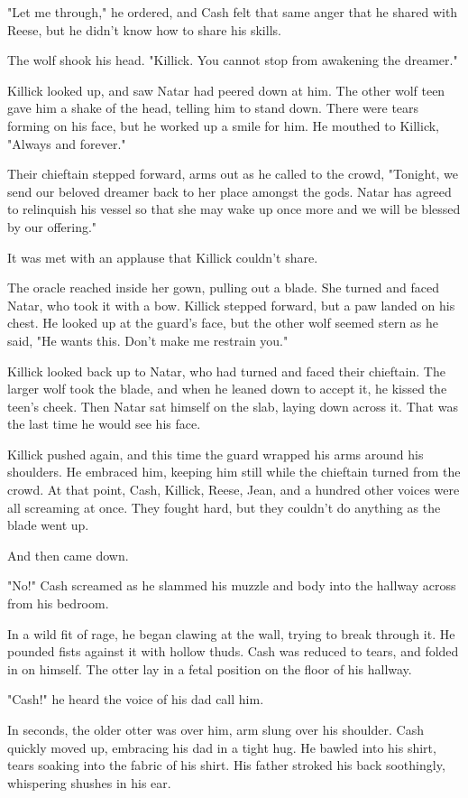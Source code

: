"Let me through," he ordered, and Cash felt that same anger that he shared with Reese, but he didn't know how to share his skills.

The wolf shook his head. "Killick. You cannot stop from awakening the dreamer."

Killick looked up, and saw Natar had peered down at him. The other wolf teen gave him a shake of the head, telling him to stand down. There were tears forming on his face, but he worked up a smile for him. He mouthed to Killick, "Always and forever."

Their chieftain stepped forward, arms out as he called to the crowd, "Tonight, we send our beloved dreamer back to her place amongst the gods. Natar has agreed to relinquish his vessel so that she may wake up once more and we will be blessed by our offering."

It was met with an applause that Killick couldn't share.

The oracle reached inside her gown, pulling out a blade. She turned and faced Natar, who took it with a bow. Killick stepped forward, but a paw landed on his chest. He looked up at the guard's face, but the other wolf seemed stern as he said, "He wants this. Don't make me restrain you."

Killick looked back up to Natar, who had turned and faced their chieftain. The larger wolf took the blade, and when he leaned down to accept it, he kissed the teen's cheek. Then Natar sat himself on the slab, laying down across it. That was the last time he would see his face.

Killick pushed again, and this time the guard wrapped his arms around his shoulders. He embraced him, keeping him still while the chieftain turned from the crowd. At that point, Cash, Killick, Reese, Jean, and a hundred other voices were all screaming at once. They fought hard, but they couldn't do anything as the blade went up.

And then came down.

"No!" Cash screamed as he slammed his muzzle and body into the hallway across from his bedroom.

In a wild fit of rage, he began clawing at the wall, trying to break through it. He pounded fists against it with hollow thuds. Cash was reduced to tears, and folded in on himself. The otter lay in a fetal position on the floor of his hallway.

"Cash!" he heard the voice of his dad call him.

In seconds, the older otter was over him, arm slung over his shoulder. Cash quickly moved up, embracing his dad in a tight hug. He bawled into his shirt, tears soaking into the fabric of his shirt. His father stroked his back soothingly, whispering shushes in his ear.

